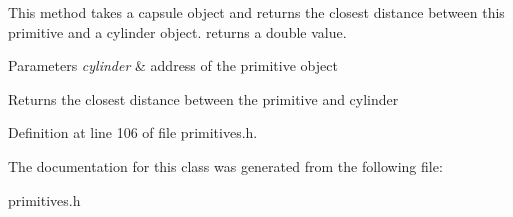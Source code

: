 This method takes a capsule object and returns the closest distance between this primitive and a cylinder object. returns a double value.


\begin{DoxyParams}{Parameters}
{\em cylinder} & address of the primitive object \\
\hline
\end{DoxyParams}
\begin{DoxyReturn}{Returns}
the closest distance between the primitive and cylinder 
\end{DoxyReturn}


Definition at line 106 of file primitives.\+h.



The documentation for this class was generated from the following file\+:\begin{DoxyCompactItemize}
\item 
primitives.\+h\end{DoxyCompactItemize}
